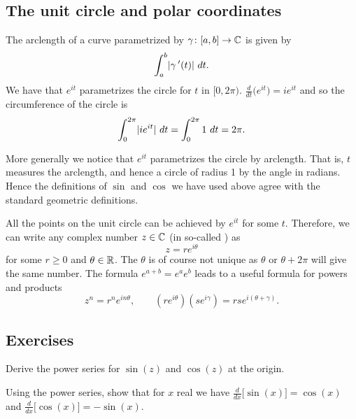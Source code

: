 \subsection{The unit circle and polar coordinates}

The arclength of a curve parametrized by $\gamma \colon [a,b] \to {\mathbb{C}}$ is given
by
\begin{equation*}
\int_a^b \lvert {\gamma^{\:\prime}(t)} \rvert ~ dt .
\end{equation*}
We have that $e^{it}$ parametrizes the circle for $t$ in $[0,2\pi)$.
$\frac{d}{dt} \bigl( e^{it} \bigr) = ie^{it}$ and so the circumference of the
circle is
\begin{equation*}
\int_0^{2\pi} \lvert {i e^{it}} \rvert  ~  dt
=
\int_0^{2\pi} 1  ~  dt  = 2\pi .
\end{equation*}

More generally we notice that $e^{it}$ parametrizes the circle by arclength.
That is, $t$ measures the arclength, and hence a circle of radius 1 by
the angle in radians.  Hence the definitions of $\sin$ and $\cos$ we have
used above agree with the standard geometric definitions.

All the points on the unit circle can be achieved by
$e^{it}$ for some $t$.
Therefore,
we can write
any complex number $z \in {\mathbb{C}}$
(in so-called \emph{}) as
\begin{equation*}
z = r e^{i\theta}
\end{equation*}
for some $r \geq 0$ and $\theta \in {\mathbb{R}}$.  The $\theta$ is of course
not unique as $\theta$ or $\theta+2\pi$ will give the same number.
The formula $e^{a+b} = e^a e^b$ leads to a useful formula for powers
and products
\begin{equation*}
z^n = r^n e^{i n \theta} ,
\qquad
(r e^{i\theta})
(s e^{i\gamma})
=
rs e^{i(\theta+\gamma)} .
\end{equation*}


\subsection{Exercises}

\begin{exercise}
Derive the power series for $\sin(z)$ and $\cos(z)$ at the origin.
\end{exercise}

\begin{exercise}
Using the power series, show that for $x$ real we have
$\frac{d}{dx} \bigl[ \sin(x)\bigr] = \cos(x)$ and
$\frac{d}{dx} \bigl[ \cos(x)\bigr] = -\sin(x)$.
\end{exercise}

